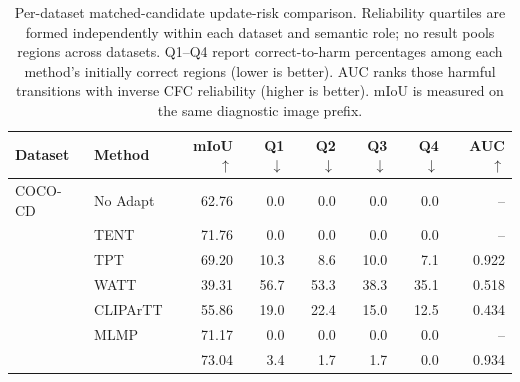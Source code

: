 \begin{table}[t]
\centering
\small
\setlength{\tabcolsep}{4.5pt}
\caption{Per-dataset matched-candidate update-risk comparison. Reliability quartiles are formed independently within each dataset and semantic role; no result pools regions across datasets. Q1--Q4 report correct-to-harm percentages among each method's initially correct regions (lower is better). AUC ranks those harmful transitions with inverse CFC reliability (higher is better). mIoU is measured on the same diagnostic image prefix.}
\label{tab:source-risk-per-dataset}
\begin{tabular}{llrrrrrr}
\toprule
Dataset & Method & mIoU $\uparrow$ & Q1 $\downarrow$ & Q2 $\downarrow$ & Q3 $\downarrow$ & Q4 $\downarrow$ & AUC $\uparrow$ \\
\midrule
COCO-CD & No Adapt & 62.76 & 0.0 & 0.0 & 0.0 & 0.0 & -- \\
 & TENT & 71.76 & 0.0 & 0.0 & 0.0 & 0.0 & -- \\
 & TPT & 69.20 & 10.3 & 8.6 & 10.0 & 7.1 & 0.922 \\
 & WATT & 39.31 & 56.7 & 53.3 & 38.3 & 35.1 & 0.518 \\
 & CLIPArTT & 55.86 & 19.0 & 22.4 & 15.0 & 12.5 & 0.434 \\
 & MLMP & 71.17 & 0.0 & 0.0 & 0.0 & 0.0 & -- \\
 & \textbf{\method{}} & 73.04 & 3.4 & 1.7 & 1.7 & 0.0 & 0.934 \\
\bottomrule
\end{tabular}
\end{table}
